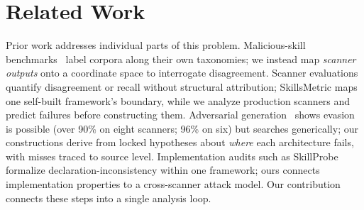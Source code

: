 \documentclass[sigconf,nonacm]{acmart}
\begin{document}
\section{Related Work}
\label{sec:related}

Prior work addresses individual parts of this problem. Malicious-skill benchmarks~\cite{malskillbench2026,skilltrustbench2026} label corpora along their own taxonomies; we instead map \emph{scanner outputs} onto a coordinate space to interrogate disagreement. Scanner evaluations~\cite{clawhub2026,locatejudge2026,skillscan2026,skillsmetric2026} quantify disagreement or recall without structural attribution; SkillsMetric maps one self-built framework's boundary, while we analyze production scanners and predict failures before constructing them. Adversarial generation~\cite{cloakdetonate2026,colluskill2026} shows evasion is possible (over 90\% on eight scanners; 96\% on six) but searches generically; our constructions derive from locked hypotheses about \emph{where} each architecture fails, with misses traced to source level. Implementation audits such as SkillProbe~\cite{skillprobe2026} formalize declaration-inconsistency within one framework; ours connects implementation properties to a cross-scanner attack model. Our contribution connects these steps into a single analysis loop.



\end{document}
